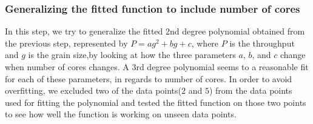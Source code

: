 \vspace{\baselineskip}	
\subsubsection{Generalizing the fitted function to include number of cores}
In this step, we try to generalize the fitted 2nd degree polynomial obtained from the previous step, represented by $P=ag^2+bg+c$, where $P$ is the throughput and $g$ is the grain size,by looking at how the three parameters $a$, $b$, and $c$ change when number of cores changes. 
A $3$rd degree polynomial seems to a reasonable fit for each of these parameters, in regards to number of cores. In order to avoid overfitting, we excluded two of the data points($2$ and $5$) from the data points used for fitting the polynomial and tested the fitted function on those two points to see how well the function is working on unseen data points. 


